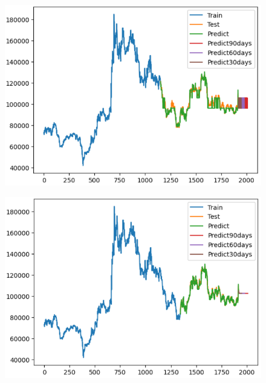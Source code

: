 \documentclass[conference]{IEEEtran}
\begin{document}
\begin{figure}[H]
    \centering
    \begin{minipage}{0.15\textwidth}
    \centering
    \includegraphics[width=1\textwidth]{Image/XGBoost/XGBoost_LG_6_4.png}
   
    \label{fig:1}
    \end{minipage}%
    \begin{minipage}{0.15\textwidth}
    \centering
    \includegraphics[width=1\textwidth]{Image/XGBoost/XGBoost_LG_7_3.png}
  

\end{minipage}
\end{figure}
\end{document}
